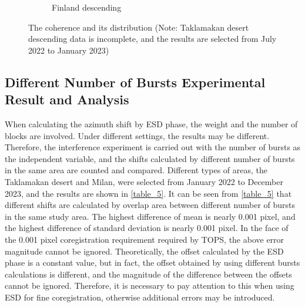 \documentclass[preprint, authoryear]{elsarticle}
\begin{document}
\begin{figure}
\begin{subfigure}{0.5\textwidth}
\begin{minipage}{0.5\textwidth}
        \end{minipage}
        \caption{Finland descending}
        \label{fig_6i}
    \end{subfigure}%
    \caption{The coherence and its distribution (Note: Taklamakan desert descending data is incomplete, and the results are selected from July 2022 to January 2023)}
    \label{fig_6}
\end{figure}

\subsection{Different Number of Bursts Experimental Result and Analysis}

When calculating the azimuth shift by ESD phase, the weight and the number of blocks are involved. Under different settings, the results may be different. Therefore, the interference experiment is carried out with the number of bursts as the independent variable, and the shifts calculated by different number of bursts in the same area are counted and compared. Different types of areas, the Taklamakan desert and Milan, were selected from January 2022 to December 2023, and the results are shown in \ref{table_5}. It can be seen from \ref{table_5} that different shifts are calculated by overlap area between different number of bursts in the same study area. The highest difference of mean is nearly 0.001 pixel, and the highest difference of standard deviation is nearly 0.001 pixel. In the face of the 0.001 pixel coregistration requirement required by TOPS, the above error magnitude cannot be ignored. Theoretically, the offset calculated by the ESD phase is a constant value, but in fact, the offset obtained by using different bursts calculations is different, and the magnitude of the difference between the offsets cannot be ignored. Therefore, it is necessary to pay attention to this when using ESD for fine coregistration, otherwise additional errors may be introduced. \par
\end{document}
